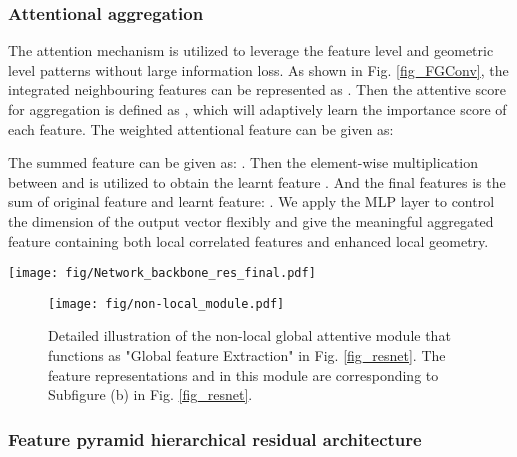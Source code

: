 \documentclass[journal]{IEEEtran}
\begin{document}
\subsubsection{Attentional aggregation}
The attention mechanism is utilized to leverage the feature level and geometric level patterns without large information loss. As shown in Fig. \ref{fig_FGConv}, the integrated neighbouring features can be represented as  . Then the attentive score for aggregation is defined as , which will adaptively learn the importance score of each feature. The weighted attentional feature  can be given as:


The summed feature can be given as: . Then the element-wise multiplication between  and  is utilized to obtain the learnt feature .
And the final features  is the sum of original feature and learnt feature: .
We apply the MLP layer to control the dimension of the output vector flexibly and give the meaningful aggregated feature  containing both local correlated features and enhanced local geometry. 

\begin{figure*}[ht]
\centering
\texttt{[image: fig/Network\_backbone\_res\_final.pdf]}
\caption{The detailed residual learning block design of our  is shown in the subfigure (a), in which we show the original inefficient residual learning block and our designed residual learning block respectively, and the proposed feature pyramid residual learning network is shown in the subfigure (b).  and  stand for the number of classes in classification of the presence of objects or not, and number of classes in semantic segmentation respectively.}
\label{fig_resnet}
\end{figure*}


\begin{figure}[ht]
\centering
\texttt{[image: fig/non-local\_module.pdf]}
\caption{Detailed illustration of the non-local global attentive module that functions as "Global feature Extraction" in Fig. \ref{fig_resnet}. The feature representations  and  in this module are corresponding to Subfigure (b) in Fig. \ref{fig_resnet}.}
\label{fig_nonlocal}
\vspace{-8.8mm}
\end{figure}
\subsubsection{Feature pyramid hierarchical residual architecture}
\end{document}
